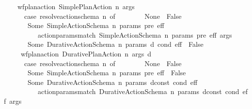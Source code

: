 \begin{isabellebody}
\ \ \ \ {\isachardoublequoteopen}wf{\isacharunderscore}{\kern0pt}plan{\isacharunderscore}{\kern0pt}action\ {\isacharparenleft}{\kern0pt}Simple{\isacharunderscore}{\kern0pt}Plan{\isacharunderscore}{\kern0pt}Action\ n\ args{\isacharparenright}{\kern0pt}\ {\isacharequal}{\kern0pt}\ {\isacharparenleft}{\kern0pt}\isanewline
\ \ \ \ \ \ case\ resolve{\isacharunderscore}{\kern0pt}action{\isacharunderscore}{\kern0pt}schema\ n\ of\isanewline
\ \ \ \ \ \ \ \ None\ {\isasymRightarrow}\ False\isanewline
\ \ \ \ \ \ {\isacharbar}{\kern0pt}\ Some\ {\isacharparenleft}{\kern0pt}Simple{\isacharunderscore}{\kern0pt}Action{\isacharunderscore}{\kern0pt}Schema\ n\ params\ pre\ eff{\isacharparenright}{\kern0pt}\ {\isasymRightarrow}\ \isanewline
\ \ \ \ \ \ \ \ \ \ action{\isacharunderscore}{\kern0pt}params{\isacharunderscore}{\kern0pt}match\ {\isacharparenleft}{\kern0pt}Simple{\isacharunderscore}{\kern0pt}Action{\isacharunderscore}{\kern0pt}Schema\ n\ params\ pre\ eff{\isacharparenright}{\kern0pt}\ args\isanewline
\ \ \ \ \ \ {\isacharbar}{\kern0pt}\ Some\ {\isacharparenleft}{\kern0pt}Durative{\isacharunderscore}{\kern0pt}Action{\isacharunderscore}{\kern0pt}Schema\ n\ params\ d\ cond\ eff{\isacharparenright}{\kern0pt}\ {\isasymRightarrow}\ False{\isacharparenright}{\kern0pt}{\isachardoublequoteclose}\isanewline
\ \ \ \ {\isacharbar}{\kern0pt}\ {\isachardoublequoteopen}wf{\isacharunderscore}{\kern0pt}plan{\isacharunderscore}{\kern0pt}action\ {\isacharparenleft}{\kern0pt}Durative{\isacharunderscore}{\kern0pt}Plan{\isacharunderscore}{\kern0pt}Action\ n\ args\ d{\isacharparenright}{\kern0pt}\ {\isacharequal}{\kern0pt}\ {\isacharparenleft}{\kern0pt}\isanewline
\ \ \ \ \ \ case\ resolve{\isacharunderscore}{\kern0pt}action{\isacharunderscore}{\kern0pt}schema\ n\ of\isanewline
\ \ \ \ \ \ \ \ None\ {\isasymRightarrow}\ False\isanewline
\ \ \ \ \ \ {\isacharbar}{\kern0pt}\ Some\ {\isacharparenleft}{\kern0pt}Simple{\isacharunderscore}{\kern0pt}Action{\isacharunderscore}{\kern0pt}Schema\ n\ params\ pre\ eff{\isacharparenright}{\kern0pt}\ {\isasymRightarrow}\ False\isanewline
\ \ \ \ \ \ {\isacharbar}{\kern0pt}\ Some\ {\isacharparenleft}{\kern0pt}Durative{\isacharunderscore}{\kern0pt}Action{\isacharunderscore}{\kern0pt}Schema\ n\ params\ dconst\ cond\ eff{\isacharparenright}{\kern0pt}\ {\isasymRightarrow}\ \isanewline
\ \ \ \ \ \ \ \ \ \ action{\isacharunderscore}{\kern0pt}params{\isacharunderscore}{\kern0pt}match\ {\isacharparenleft}{\kern0pt}Durative{\isacharunderscore}{\kern0pt}Action{\isacharunderscore}{\kern0pt}Schema\ n\ params\ dconst\ cond\ eff{\isacharparenright}{\kern0pt}\ args\isanewline

\end{isabellebody}
